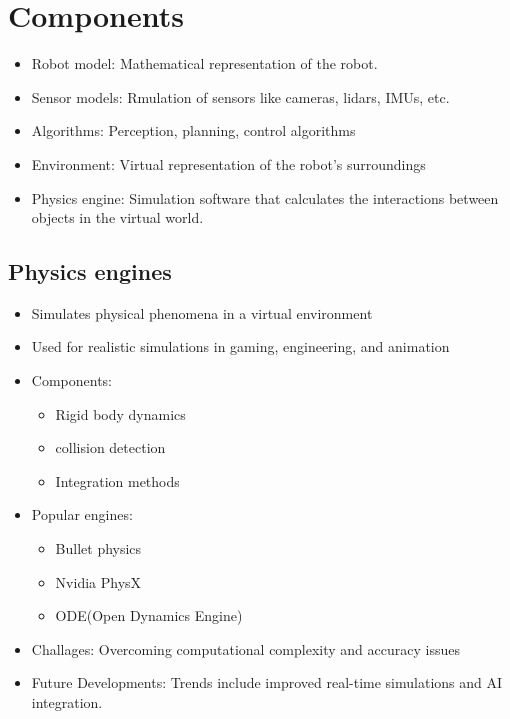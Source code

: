 \section{Components}
\begin{itemize}
    \item Robot model: Mathematical representation of the robot.
    \item Sensor models: Rmulation of sensors like cameras, lidars, IMUs, etc.
    \item Algorithms: Perception, planning, control algorithms
    \item Environment: Virtual representation of the robot's surroundings 
    \item Physics engine: Simulation software that calculates the interactions between objects in the virtual world.
\end{itemize}

\subsection{Physics engines}
\begin{itemize}
        \item Simulates physical phenomena in a virtual environment
        \item Used for realistic simulations in gaming, engineering, and animation
        \item Components:
            \begin{itemize}
                    \item Rigid body dynamics
                    \item collision detection
                    \item Integration methods
                    
            \end{itemize}
        \item Popular engines:
            \begin{itemize}
                    \item Bullet physics
                    \item Nvidia PhysX
                    \item ODE(Open Dynamics Engine)

                    
            \end{itemize}

        \item Challages: Overcoming computational complexity and accuracy issues
        \item Future Developments: Trends include improved real-time simulations and AI integration.
\end{itemize}


